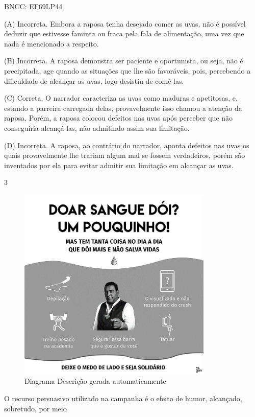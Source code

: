 BNCC: EF69LP44

(A) Incorreta. Embora a raposa tenha desejado comer as uvas, não é
possível deduzir que estivesse faminta ou fraca pela fala de
alimentação, uma vez que nada é mencionado a respeito.

(B) Incorreta. A raposa demonstra ser paciente e oportunista, ou seja,
não é precipitada, age quando as situações que lhe são favoráveis, pois,
percebendo a dificuldade de alcançar as uvas, logo desistiu de comê-las.

(C) Correta. O narrador caracteriza as uvas como maduras e apetitosas,
e, estando a parreira carregada delas, provavelmente isso chamou a
atenção da raposa. Porém, a raposa colocou defeitos nas uvas após
perceber que não conseguiria alcançá-las, não admitindo assim sua
limitação.

(D) Incorreta. A raposa, ao contrário do narrador, aponta defeitos nas
uvas os quais provavelmente lhe trariam algum mal se fossem verdadeiros,
porém são inventados por ela para evitar admitir sua limitação em
alcançar as uvas.

\num{3}

\begin{figure}
\centering
\includegraphics[width=3.65556in,height=3.65556in]{./imgSAEB_8_POR/media/image38.png}
\caption{Diagrama Descrição gerada automaticamente}
\end{figure}


O recurso persuasivo utilizado na campanha é o efeito de humor,
alcançado, sobretudo, por meio

